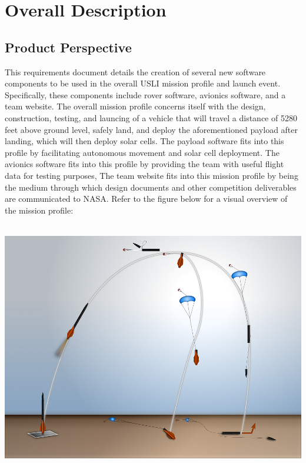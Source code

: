 \documentclass[onecolumn, draftclsnofoot, 10pt, compsoc]{IEEEtran}
\begin{document}
\section{Overall Description}

\subsection{Product Perspective}
This requirements document details the creation of several new software components to be used in the overall USLI mission profile and launch event. Specifically, these components include rover software, avionics software, and a team website. The overall mission profile concerns itself with the design, construction, testing, and launcing of a vehicle that will travel a distance of 5280 feet above ground level, safely land, and deploy the aforementioned payload after landing, which will then deploy solar cells. The payload software fits into this profile by facilitating autonomous movement and solar cell deployment. The avionics software fits into this profile by providing the team with useful flight data for testing purposes, The team website fits into this mission profile by being the medium through which design documents and other competition deliverables are communicated to NASA. Refer to the figure below for a visual overview of the mission profile:\\ \\
\begin{minipage}{\linewidth}
\begin{center}
\includegraphics[width=\textwidth]{mission-profile}
\end{center}
\end{minipage}
\end{document}
